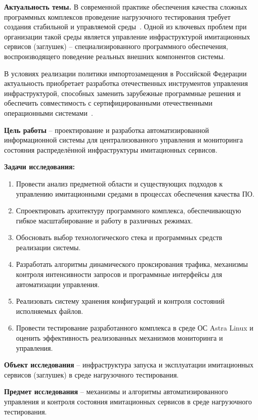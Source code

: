 \Introduction

\textbf{Актуальность темы.} В современной практике обеспечения качества сложных программных комплексов проведение нагрузочного тестирования требует создания стабильной и управляемой среды~\cite{gost-56920-2024, kulikov-testing}. Одной из ключевых проблем при организации такой среды является управление инфраструктурой имитационных сервисов (заглушек) -- специализированного программного обеспечения, воспроизводящего поведение реальных внешних компонентов системы.

В условиях реализации политики импортозамещения в Российской Федерации актуальность приобретает разработка отечественных инструментов управления инфраструктурой, способных заменить зарубежные программные решения и обеспечить совместимость с сертифицированными отечественными операционными системами~\cite{burenin-astra}.

\textbf{Цель работы} -- проектирование и разработка автоматизированной информационной системы для централизованного управления и мониторинга состояния распределённой инфраструктуры имитационных сервисов.

\textbf{Задачи исследования:}
\begin{enumerate}
  \item Провести анализ предметной области и существующих подходов к управлению имитационными средами в процессах обеспечения качества ПО.
  \item Спроектировать архитектуру программного комплекса, обеспечивающую гибкое масштабирование и работу в различных режимах.
  \item Обосновать выбор технологического стека и программных средств реализации системы.
  \item Разработать алгоритмы динамического проксирования трафика, механизмы контроля интенсивности запросов и программные интерфейсы для автоматизации управления.
  \item Реализовать систему хранения конфигураций и контроля состояний исполняемых файлов.
  \item Провести тестирование разработанного комплекса в среде ОС Astra Linux и оценить эффективность реализованных механизмов мониторинга и управления.
\end{enumerate}

\textbf{Объект исследования} -- инфраструктура запуска и эксплуатации имитационных сервисов (заглушек) в среде нагрузочного тестирования.

\textbf{Предмет исследования} -- механизмы и алгоритмы автоматизированного управления и контроля состояния имитационных сервисов в среде нагрузочного тестирования.

